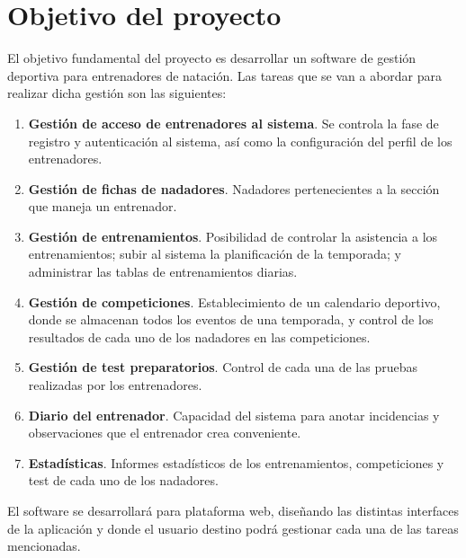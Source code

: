 \section*{Objetivo del proyecto} %
	\label{sec:objetivo_del_proyecto}
	
	El objetivo fundamental  del proyecto es desarrollar un software de gestión deportiva para entrenadores de natación. Las tareas que se van a abordar para realizar dicha gestión son las siguientes:
	
	\begin{enumerate}
		\item {{\bf Gestión de acceso de entrenadores al sistema}. Se controla la fase de registro y autenticación al sistema, así como la configuración del perfil de los entrenadores.}
		\item {{\bf Gestión de fichas de nadadores}. Nadadores pertenecientes a la sección que maneja un entrenador.}
		\item {{\bf Gestión de entrenamientos}. Posibilidad de controlar la asistencia a los entrenamientos; subir al sistema la planificación de la temporada; y administrar las tablas de entrenamientos diarias.}
		\item {{\bf Gestión de competiciones}. Establecimiento de un calendario deportivo, donde se almacenan todos los eventos de una temporada, y control de los resultados de cada uno de los nadadores en las competiciones.}
		\item {{\bf Gestión de test preparatorios}. Control de cada una de las pruebas realizadas por los entrenadores.}
		\item {{\bf Diario del entrenador}. Capacidad del sistema para anotar incidencias y observaciones que el entrenador crea conveniente.}
		\item {{\bf Estadísticas}. Informes estadísticos de los entrenamientos, competiciones y test de cada uno de los nadadores.}
	\end{enumerate}
	
	El software se desarrollará para plataforma web, diseñando las distintas interfaces de la aplicación y donde el usuario destino podrá gestionar cada una de las tareas mencionadas.